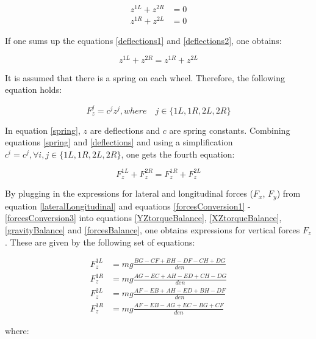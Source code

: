 \documentclass[paper=a4, fontsize=11pt]{scrartcl} %
\numberwithin{equation}{section} %
\numberwithin{figure}{section} %
\numberwithin{table}{section} %
\begin{document}
\begin{align}
z^{1L} + z^{2R} &= 0 \label{deflections1}\\
z^{1R} + z^{2L} &= 0 \label{deflections2}
\end{align}

If one sums up the equations \ref{deflections1} and \ref{deflections2}, one obtains:

\begin{equation}
z^{1L} + z^{2R} = z^{1R} + z^{2L} \label{deflections} 
\end{equation}

It is assumed that there is a spring on each wheel. Therefore, the following equation holds:

\begin{equation}
F^j_z =c^jz^j, where \quad j \in \{1L,1R,2L,2R \} \label{spring} 
\end{equation}

In equation \ref{spring}, $z$ are deflections and $c$ are spring constants. Combining equations \ref{spring} and \ref{deflections} and using a simplification $c^i = c^j, \forall i,j \in \{1L,1R,2L,2R \}$, one gets the fourth equation:

\begin{equation}
F_z^{1L} + F_z^{2R} = F_z^{1R} + F_z^{2L} \label{forcesBalance} 
\end{equation}

By plugging in the expressions for lateral and longitudinal forces ($F_x$, $F_y$) from equation \ref{lateralLongitudinal} and equations \ref{forcesConversion1} - \ref{forcesConversion3}  into equations \ref{YZtorqueBalance}, \ref{XZtorqueBalance}, \ref{gravityBalance} and \ref{forcesBalance}, one obtains expressions for vertical forces $F_z$. These are given by the following set of equations:

\begin{align}
F^{1L}_z &= mg\frac{BG - CF + BH - DF - CH + DG}{den} \\
F^{1R}_z &= mg\frac{AG - EC + AH - ED + CH - DG}{den} \\
F^{2L}_z &= mg\frac{AF - EB + AH - ED + BH - DF}{den} \\
F^{1R}_z &= mg\frac{AF - EB - AG + EC - BG + CF}{den}
\end{align}

where:
\end{document}
